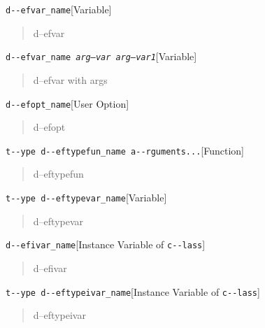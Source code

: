 \documentclass{book}
\begin{document}
\noindent\texttt{d{-}{-}efvar\_name}\hfill[Variable]



%
\begin{quote}
d--efvar
\end{quote}

\noindent\texttt{d{-}{-}efvar\_name \EmbracOn{}\textnormal{\textsl{arg--var arg--var1}}\EmbracOff{}}\hfill[Variable]



%
\begin{quote}
d--efvar with args
\end{quote}

\noindent\texttt{d{-}{-}efopt\_name}\hfill[User Option]



%
\begin{quote}
d--efopt
\end{quote}

\noindent\texttt{t{-}{-}ype d{-}{-}eftypefun\_name a{-}{-}rguments...}\hfill[Function]



%
\begin{quote}
d--eftypefun
\end{quote}

\noindent\texttt{t{-}{-}ype d{-}{-}eftypevar\_name}\hfill[Variable]



%
\begin{quote}
d--eftypevar
\end{quote}

\noindent\texttt{d{-}{-}efivar\_name}\hfill[Instance Variable of \texttt{c{-}{-}lass}]



%
\begin{quote}
d--efivar
\end{quote}

\noindent\texttt{t{-}{-}ype d{-}{-}eftypeivar\_name}\hfill[Instance Variable of \texttt{c{-}{-}lass}]



%
\begin{quote}
d--eftypeivar
\end{quote}
\end{document}
